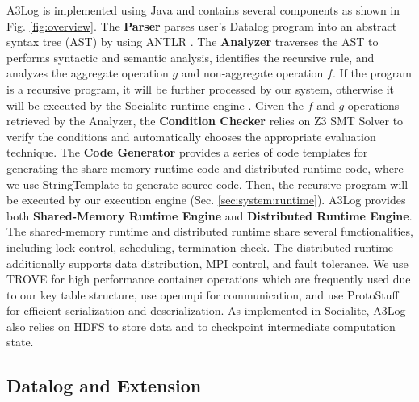 A3Log is implemented using Java and contains several components as shown in Fig. \ref{fig:overview}. The \textbf{Parser} parses user's Datalog program into an abstract syntax tree (AST) by using ANTLR \cite{antlr}. The \textbf{Analyzer} traverses the AST to performs syntactic and semantic analysis, identifies the recursive rule, and analyzes the aggregate operation $g$ and non-aggregate operation $f$. If the program is a recursive program, it will be further processed by our system, otherwise it will be executed by the Socialite runtime engine \cite{Lam:2013:SDE:2510649.2511289,Seo:2013:DSD:2556549.2556572}. Given the $f$ and $g$ operations retrieved by the Analyzer, the \textbf{Condition Checker} relies on Z3 SMT Solver \cite{DeMoura:2008:ZES:1792734.1792766,z3} to verify the conditions and automatically chooses the appropriate evaluation technique. The \textbf{Code Generator} provides a series of code templates for generating the share-memory runtime code and distributed runtime code, where we use StringTemplate \cite{stringtemplate} to generate source code. Then, the recursive program will be executed by our execution engine (Sec. \ref{sec:system:runtime}). A3Log provides both \textbf{Shared-Memory Runtime Engine} and \textbf{Distributed Runtime Engine}. The shared-memory runtime and distributed runtime share several functionalities, including lock control, scheduling, termination check. The distributed runtime additionally supports data distribution, MPI control, and fault tolerance. We use TROVE \cite{trove} for high performance container operations which are frequently used due to our key table structure, use openmpi \cite{mpich} for  communication, and use ProtoStuff \cite{Protostuff} for efficient serialization and deserialization. As implemented in Socialite, A3Log also relies on HDFS to store data and to checkpoint intermediate computation state.

\subsection{Datalog and Extension}
\label{sec:system:datalog}

